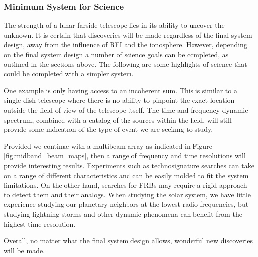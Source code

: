 \subsubsection{Minimum System for Science}
The strength of a lunar farside telescope lies in its ability to uncover the unknown. It is certain that discoveries will be made regardless of the final system design, away from the influence of RFI and the ionosphere. However, depending on the final system design a number of science goals can be completed, as outlined in the sections above. The following are some highlights of science that could be completed with a simpler system. 

One example is only having access to an incoherent sum. This is similar to a single-dish telescope where there is no ability to pinpoint the exact location outside the field of view of the telescope itself. The time and frequency dynamic spectrum, combined with a catalog of the sources within the field, will still provide some indication of the type of event we are seeking to study. 

Provided we continue with a multibeam array as indicated in Figure \ref{fig:midband_beam_maps}, then a range of frequency and time resolutions will provide interesting results. Experiments such as technosignature searches can take on a range of different characteristics and can be easily molded to fit the system limitations. On the other hand, searches for FRBs may require a rigid approach to detect them and their analogs. When studying the solar system, we have little experience studying our planetary neighbors at the lowest radio frequencies, but studying lightning storms and other dynamic phenomena can benefit from the highest time resolution.  

Overall, no matter what the final system design allows, wonderful new discoveries will be made.


